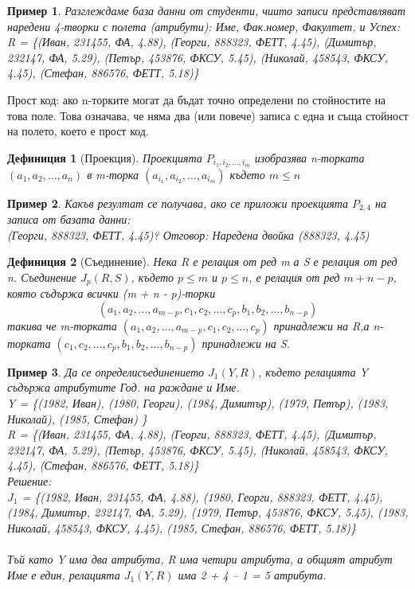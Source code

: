 \documentclass[fleqn, 12pt]{article}
\newtheorem{example}{Пример}[subsection]
\newtheorem{definition}{Дефиниция}[subsection]
\begin{document}
\begin{example}
Разглеждаме база данни от студенти, чиито записи представляват наредени 4-творки с полета (атрибути): Име, Фак.номер, Факултет, и Успех: \\
R = \{(Иван, 231455, ФА, 4.88),\;
(Георги, 888323, ФЕТТ, 4.45),\; 
(Димитър, 232147, ФА, 5.29),\;
(Петър, 453876, ФКСУ, 5.45),\;
(Николай, 458543, ФКСУ, 4.45),\;
(Стефан, 886576, ФЕТТ, 5.18)\}
\end{example}
Прост код: ако n-торките  могат да бъдат точно определени по стойностите на това поле. Това означава, че няма два (или повече) записа  с една и съща стойност на полето, което е прост код.\\

\begin{definition}[Проекция]
Проекцията $P_{i_1, i_2, ..., i_m}$ изобразява n-торката $(a_1, a_2 , ..., a_n)$ в m-торка $(a_{i_1}, a_{i_2}, ..., a_{i_m})$ където $m \leq n $
\end{definition}

\begin{example}
Какъв резултат се получава, ако се приложи проекцията $P_{2,4}$ на записа от базата данни:\\
(Георги, 888323, ФЕТТ, 4.45)?
Отговор: Наредена двойка (888323, 4.45)
\end{example}

\begin{definition}[Съединение]
Нека R е релация от ред m а S е релация от ред n. Съединение $J_p(R, S)$, където $p \leq m$ и $p \leq n$, е релация от ред $m + n - p$, която съдържа всички (m + n - p)-торки $$(a_1, a_2, ..., a_{m-p}, c_1, c_2, ..., c_p, b_1, b_2, ..., b_{n-p})$$ такива че m-торката $(a_1, a_2, ..., a_{m-p}, c_1, c_2, ..., c_p)$ принадлежи на R,а n-торката $(c_1, c_2, ..., c_p, b_1, b_2, ..., b_{n-p})$ принадлежи на S.
\end{definition}

\begin{example}
Да се определисъединението $J_1(Y, R)$, където релацията Y съдържа атрибутите Год. на раждане и Име. \\
Y = \{(1982, Иван),\;
(1980, Георги), \;
(1984, Димитър),\;
(1979, Петър),\; 
(1983, Николай),\;
(1985, Стефан) \}
\\
R = \{(Иван, 231455, ФА, 4.88),\;
(Георги, 888323, ФЕТТ, 4.45),\; 
(Димитър, 232147, ФА, 5.29),\;
(Петър, 453876, ФКСУ, 5.45),\;
(Николай, 458543, ФКСУ, 4.45),\;
(Стефан, 886576, ФЕТТ, 5.18)\} 
\\
Решение: \\
$J_1$ = \{(1982, Иван, 231455, ФА, 4.88),\;
(1980, Георги, 888323, ФЕТТ, 4.45),\;
(1984, Димитър, 232147, ФА, 5.29),\;
(1979, Петър, 453876, ФКСУ, 5.45),\;
(1983, Николай, 458543, ФКСУ, 4.45),\;
(1985, Стефан, 886576, ФЕТТ, 5.18)\} \\
\\
Тъй като Y има два атрибута, R има четири атрибута, а общият атрибут Име е един, релацията $J_1(Y, R)$ има 2 + 4 – 1 = 5 атрибута.
\end{example}
\end{document}
